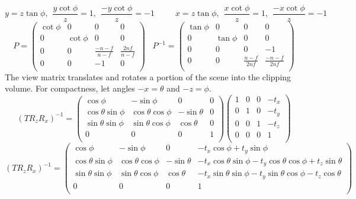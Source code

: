 \documentclass[10pt]{article}
\begin{document}
\[y = z\tan\phi, \hspace{5pt} \frac{y\cot\phi}{z} = 1, \hspace{5pt} \frac{-y\cot\phi}{z} = -1 \hspace{30pt} x = z\tan\phi, \hspace{5pt} \frac{x\cot\phi}{z} = 1, \hspace{5pt} \frac{-x\cot\phi}{z} = -1\]
\[P = \begin{pmatrix}
\cot\phi & 0 & 0 & 0 \\
0 & \cot\phi & 0 & 0 \\
0 & 0 &\frac{-n-f}{n-f} & \frac{2nf}{n-f} \\
0 & 0 & -1 & 0 \\
\end{pmatrix} \hspace{10pt}
P^{-1} = \begin{pmatrix}
\tan\phi & 0 & 0 & 0 \\
0 & \tan\phi & 0 & 0 \\
0 & 0 & 0 & -1 \\
0 & 0 & \frac{n-f}{2nf} & \frac{-n-f}{2nf} \\
\end{pmatrix}\]
The view matrix translates and rotates a portion of the scene into the clipping volume. For compactness, let angles $ -x = \theta $ and $ -z = \phi $.
\[(TR_zR_x)^{-1} = \begin{pmatrix}
\cos\phi & -\sin\phi & 0 & 0 \\
\cos\theta \sin\phi & \cos\theta \cos\phi & -\sin\theta & 0 \\
\sin\theta \sin\phi & \sin\theta \cos\phi & \cos\theta & 0 \\
0 & 0 & 0 & 1 \\
\end{pmatrix}
\begin{pmatrix}
1 & 0 & 0 & -t_x \\
0 & 1 & 0 & -t_y \\
0 & 0 & 1 & -t_z \\
0 & 0 & 0 & 1 \\
\end{pmatrix}\]
\[(TR_zR_x)^{-1} = \begin{pmatrix}
\cos\phi & -\sin\phi & 0 & -t_x\cos\phi+t_y\sin\phi \\
\cos\theta \sin\phi & \cos\theta \cos\phi & -\sin\theta & -t_x\cos\theta\sin\phi-t_y\cos\theta\cos\phi+t_z\sin\theta \\
\sin\theta \sin\phi & \sin\theta \cos\phi & \cos\theta & -t_x\sin\theta\sin\phi-t_y\sin\theta\cos\phi-t_z\cos\theta \\
0 & 0 & 0 & 1 \\
\end{pmatrix}\]
\end{document}
